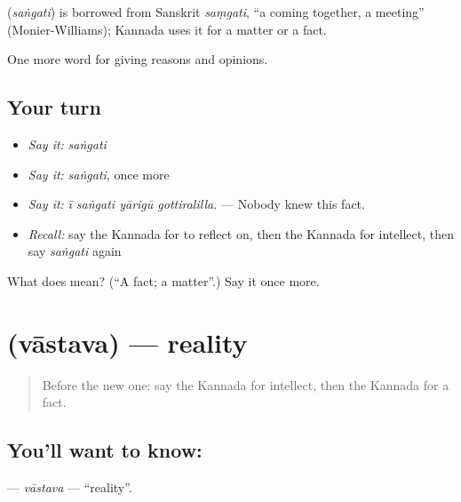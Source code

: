 \begin{cousinweb}
\textbf{} (\emph{saṅgati}) is borrowed from Sanskrit \emph{saṃgati}, \textquotedblleft{}a coming together, a meeting\textquotedblright{} (Monier-Williams); Kannada uses it for a matter or a fact.
\end{cousinweb}

\begin{grammarlens}[title={What you've built}]
One more word for giving reasons and opinions.
\end{grammarlens}

\subsection*{Your turn}
\begin{itemize}
\raggedright
  \item \emph{Say it:} \emph{saṅgati}
  \item \emph{Say it:} \emph{saṅgati}, once more
  \item \emph{Say it:} \emph{ī saṅgati yārigū gottiralilla.} — Nobody knew this fact.
  \item \emph{Recall:} say the Kannada for to reflect on, then the Kannada for intellect, then say \emph{saṅgati} again
\end{itemize}

\begin{tcolorbox}[breakable,colback=teal!4,colframe=teal!35!black,title={Before you move on}]
What does  mean? (\textquotedblleft{}A fact; a matter\textquotedblright{}.) Say it once more.
\end{tcolorbox}
\section[\texorpdfstring{\kn{ವಾಸ್ತವ} (vāstava)}{ವಾಸ್ತವ (vāstava)}]{ (vāstava) — reality}

\label{lesson:KA-C382-vastava}



\begin{quote}
Before the new one: say the Kannada for intellect, then the Kannada for a fact.
\end{quote}

\subsection*{You'll want to know: }
\textbf{} — \emph{vāstava} — \textquotedblleft{}reality\textquotedblright{}.

